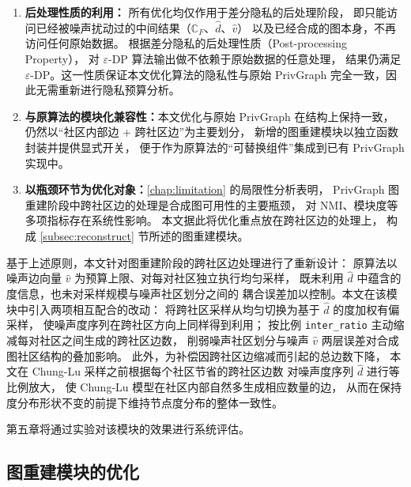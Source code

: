 \begin{enumerate}
    \item \textbf{后处理性质的利用}\cite{dwork_algorithmic_2014}\textbf{：}
    所有优化均仅作用于差分隐私的后处理阶段，
    即只能访问已经被噪声扰动过的中间结果（$\mathbb{C}_F$、$\hat{d}$、$\hat{v}$）
    以及已经合成的图本身，不再访问任何原始数据。
    根据差分隐私的后处理性质（Post-processing Property），
    对 $\varepsilon$-DP 算法输出做不依赖于原始数据的任意处理，
    结果仍满足 $\varepsilon$-DP。这一性质保证本文优化算法的隐私性与原始 PrivGraph 
    完全一致，因此无需重新进行隐私预算分析。
    
    \item \textbf{与原算法的模块化兼容性：}本文优化与原始 PrivGraph 在结构上保持一致，
    仍然以``社区内部边 + 跨社区边''为主要划分，
    新增的图重建模块以独立函数封装并提供显式开关，
    便于作为原算法的``可替换组件''集成到已有 PrivGraph 实现中。
    
    \item \textbf{以瓶颈环节为优化对象：}\autoref{chap:limitation} 的局限性分析表明，
    PrivGraph 图重建阶段中跨社区边的处理是合成图可用性的主要瓶颈，
    对 NMI、模块度等多项指标存在系统性影响。
    本文据此将优化重点放在跨社区边的处理上，
    构成 \autoref{subsec:reconstruct} 节所述的图重建模块。
\end{enumerate}

\par 基于上述原则，本文针对图重建阶段的跨社区边处理进行了重新设计：
原算法以噪声边向量 $\hat{v}$ 为预算上限、对每对社区独立执行均匀采样，
既未利用 $\hat{d}$ 中蕴含的度信息，也未对采样规模与噪声社区划分之间的
耦合误差加以控制。本文在该模块中引入两项相互配合的改动：
将跨社区采样从均匀切换为基于 $\hat{d}$ 的度加权有偏采样，
使噪声度序列在跨社区方向上同样得到利用；
按比例 \texttt{inter\_ratio} 主动缩减每对社区之间生成的跨社区边数，
削弱噪声社区划分与噪声 $\hat{v}$ 两层误差对合成图社区结构的叠加影响。
此外，为补偿因跨社区边缩减而引起的总边数下降，
本文在 Chung-Lu 采样之前根据每个社区节省的跨社区边数
对噪声度序列 $\hat{d}$ 进行等比例放大，
使 Chung-Lu 模型在社区内部自然多生成相应数量的边，
从而在保持度分布形状不变的前提下维持节点度分布的整体一致性。

\par 第五章将通过实验对该模块的效果进行系统评估。

\subsection{图重建模块的优化}
\label{subsec:reconstruct}

